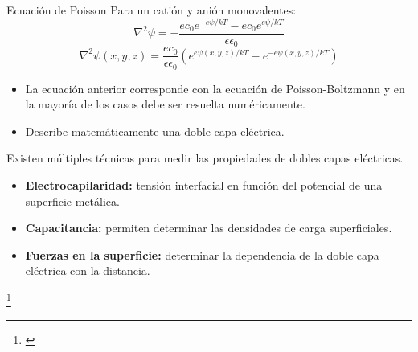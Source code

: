 \documentclass[handout]{beamer}
\newcommand\blfootnote[1]
{%
	\begingroup
	\renewcommand\thefootnote{}\footnote{#1}%
	\addtocounter{footnote}{-1}%
	\endgroup
}
\newcommand{\fcite}[1]{\blfootnote{\cite{#1}}}
\begin{document}
\begin{frame}{Ecuaci\'on de Poisson}
	Para un cati\'on y ani\'on monovalentes:
	\begin{equation}
		\nabla^2 \psi = -\dfrac{e c_{0}e^{-e\psi/kT} - e c_{0}e^{e\psi/kT}}{\epsilon\epsilon_0}
	\end{equation}
	\begin{equation}
		\nabla^2 \psi(x, y, z) = \dfrac{ec_0}{\epsilon\epsilon_0} \left(e^{e\psi(x, y, z)/kT} -e^{-e\psi(x, y, z)/kT}\right)
	\end{equation}
	
	\begin{itemize}
		\item La ecuaci\'on anterior corresponde con la ecuaci\'on de Poisson-Boltzmann y en la mayor\'ia de los casos debe ser resuelta num\'ericamente.
		
		\item Describe matem\'aticamente una doble capa el\'ectrica.
	\end{itemize}
\end{frame}

\begin{frame}{}
	Existen m\'ultiples t\'ecnicas para medir las propiedades de dobles capas el\'ectricas.
	\begin{itemize}
		\item \textbf{Electrocapilaridad:} tensi\'on interfacial en funci\'on del potencial de una superficie met\'alica.
		\item \textbf{Capacitancia:} permiten determinar las densidades de carga superficiales.
		\item \textbf{Fuerzas en la superficie:} determinar la dependencia de la doble capa el\'ectrica con la distancia.
	\end{itemize}
	\fcite{butt2006physics}
\end{frame}
\end{document}
